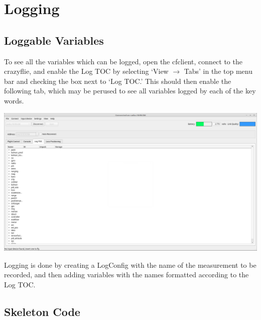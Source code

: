 \documentclass[]{article}
\begin{document}
\section{Logging}

\subsection{Loggable Variables}

\noindent To see all the variables which can be logged, open the cfclient, connect to the crazyflie, and enable the Log TOC by selecting `View $\rightarrow$ Tabs' in the top menu bar and checking the box next to `Log TOC.' This should then enable the following tab, which may be perused to see all variables logged by each of the key words.

\includegraphics[width=1\linewidth]{TOCList.png}

Logging is done by creating a LogConfig with the name of the measurement to be recorded, and then adding variables with the names formatted according to the Log TOC.

\subsection{Skeleton Code}
\end{document}
